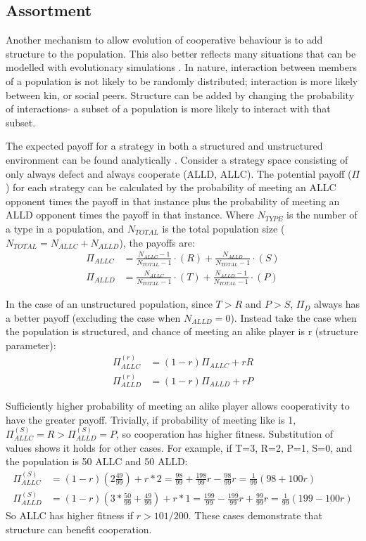 \documentclass[a4paper,11pt,bcshonoursthesis,singlespace,oneside,thesisdraft,pdflatex]{cssethesis}
\begin{document}
\subsection{Assortment}
Another mechanism to allow evolution of cooperative behaviour is to add structure to the population. 
This also better reflects many situations that can be modelled with evolutionary simulations \citep{eshel:PNAS:1982}. 
In nature, interaction between members of a population is not likely to be randomly distributed; interaction is more likely between kin, or social peers. 
Structure can be added by changing the probability of interactions- a subset of a population is more likely to interact with that subset. 

The expected payoff for a strategy in both a structured and unstructured environment can be found analytically \citep{van-veelen:PNAS:2012}. 
Consider a strategy space consisting of only always defect and always cooperate (ALLD, ALLC). 
The potential payoff ($\Pi$) for each strategy can be calculated by the probability of meeting an ALLC opponent times the payoff in that instance plus the probability of meeting an ALLD opponent times the payoff in that instance. Where $N_{TYPE}$ is the number of a type in a population, and $N_{TOTAL}$ is the total population size ($N_{TOTAL}=N_{ALLC}+ N_{ALLD}$), the payoffs are:
\begin{align*}
\Pi_{ALLC}&=\frac{N_{ALLC}-1}{N_{TOTAL}-1} \cdot (R) + \frac{N_{ALLD}}{N_{TOTAL}-1}\cdot ({S})\\
\Pi_{ALLD}&=\frac{N_{ALLC}}{N_{TOTAL}-1} \cdot (T) + \frac{N_{ALLD}-1}{N_{TOTAL}-1}\cdot ({P})
\end{align*}

In the case of an unstructured population, since $T>R$ and $P>S$, $\Pi_D$ always has a better payoff (excluding the case when $N_{ALLD}=0$). 
Instead take the case when the population is structured, and chance of meeting an alike player is r (structure parameter):
\begin{align*}
\Pi^{(r)}_{ALLC}&=(1-r)\Pi_{ALLC}+ rR\\
\Pi^{(r)}_{ALLD}&=(1-r)\Pi_{ALLD}+ rP
\end{align*}

Sufficiently higher probability of meeting an alike player allows cooperativity to have the greater payoff. 
Trivially, if probability of meeting like is 1, $\Pi^{(S)}_{ALLC}=R>\Pi^{(S)}_{ALLD}=P$, so cooperation has higher fitness.  
Substitution of values shows it holds for other cases. 
For example, if T=3, R=2, P=1, S=0, and the population is 50 ALLC and 50 ALLD:
\begin{align*}
\Pi^{(S)}_{ALLC}&=(1-r)(2\frac{49}{99})+r*2=\frac{98}{99}+\frac{198}{99}r-\frac{98}{99}r=\frac{1}{99}(98+100r)\\
\Pi^{(S)}_{ALLD}&=(1-r)(3*\frac{50}{99} + \frac{49}{99})+ r*1=\frac{199}{99}-\frac{199}{99}r+\frac{99}{99}r=\frac{1}{99}(199-100r)
\end{align*}
So ALLC has higher fitness if $r>101/200$. These cases demonstrate that structure can benefit cooperation. 
\end{document}
